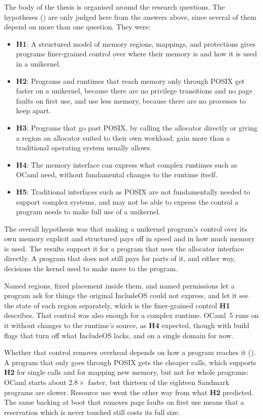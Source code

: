 \documentclass[12pt]{report}
\newcommand{\fullref}[1]{\Cref{#1}}
\newcommand{\hypothesis}[1]{\textbf{#1}}
\renewcommand{\_}{\origunderscore\allowbreak}
\begin{document}
The body of the thesis is organised around the research questions. The hypotheses (\fullref{sec:hypothesis}) are only judged here from the answers above, since several of them depend on more than one question. They were:
\begin{itemize}
  \item \hypothesis{H1}: A structured model of memory regions, mappings, and protections gives programs finer-grained control over where their memory is and how it is used in a unikernel.
  \item \hypothesis{H2}: Programs and runtimes that reach memory only through POSIX get faster on a unikernel, because there are no privilege transitions and no page faults on first use, and use less memory, because there are no processes to keep apart.
  \item \hypothesis{H3}: Programs that go past POSIX, by calling the allocator directly or giving a region an allocator suited to their own workload, gain more than a traditional operating system usually allows.
  \item \hypothesis{H4}: The memory interface can express what complex runtimes such as OCaml need, without fundamental changes to the runtime itself.
  \item \hypothesis{H5}: Traditional interfaces such as POSIX are not fundamentally needed to support complex systems, and may not be able to express the control a program needs to make full use of a unikernel.
\end{itemize}

The overall hypothesis was that making a unikernel program's control over its own memory explicit and structured pays off in speed and in how much memory is used. The results support it for a program that uses the allocator interface directly. A program that does not still pays for parts of it, and either way, decisions the kernel used to make move to the program.

Named regions, fixed placement inside them, and named permissions let a program ask for things the original IncludeOS could not express, and let it see the state of each region separately, which is the finer-grained control \hypothesis{H1} describes. That control was also enough for a complex runtime. OCaml~5 runs on it without changes to the runtime's source, as \hypothesis{H4} expected, though with build flags that turn off what IncludeOS lacks, and on a single domain for now.

Whether that control removes overhead depends on how a program reaches it (\fullref{sec:putting-together}). A program that only goes through POSIX gets the cheaper calls, which supports \hypothesis{H2} for single calls and for mapping new memory, but not for whole programs: OCaml starts about $2.8\times$ faster, but thirteen of the eighteen Sandmark programs are slower. Resource use went the other way from what \hypothesis{H2} predicted. The same backing at boot that removes page faults on first use means that a reservation which is never touched still costs its full size.
\end{document}
